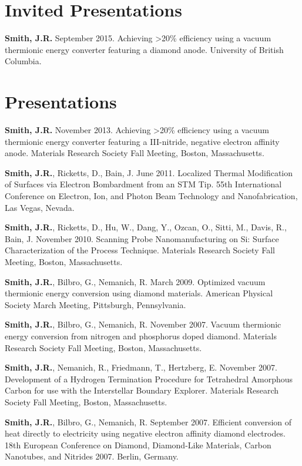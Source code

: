 \section{Invited Presentations}\label{invited-presentations}

\textbf{Smith, J.R.} September 2015. Achieving \textgreater{}20\%
efficiency using a vacuum thermionic energy converter featuring a
diamond anode. University of British Columbia.

\section{Presentations}\label{presentations}

\textbf{Smith, J.R.} November 2013. Achieving \textgreater{}20\%
efficiency using a vacuum thermionic energy converter featuring a
III-nitride, negative electron affinity anode. Materials Research
Society Fall Meeting, Boston, Massachusetts.

\textbf{Smith, J.R.}, Ricketts, D., Bain, J. June 2011. Localized
Thermal Modification of Surfaces via Electron Bombardment from an STM
Tip. 55th International Conference on Electron, Ion, and Photon Beam
Technology and Nanofabrication, Las Vegas, Nevada.

\textbf{Smith, J.R.}, Ricketts, D., Hu, W., Dang, Y., Ozcan, O., Sitti,
M., Davis, R., Bain, J. November 2010. Scanning Probe Nanomanufacturing
on Si: Surface Characterization of the Process Technique. Materials
Research Society Fall Meeting, Boston, Massachusetts.

\textbf{Smith, J.R.}, Bilbro, G., Nemanich, R. March 2009. Optimized
vacuum thermionic energy conversion using diamond materials. American
Physical Society March Meeting, Pittsburgh, Pennsylvania.

\textbf{Smith, J.R.}, Bilbro, G., Nemanich, R. November 2007. Vacuum
thermionic energy conversion from nitrogen and phosphorus doped diamond.
Materials Research Society Fall Meeting, Boston, Massachusetts.

\textbf{Smith, J.R.}, Nemanich, R., Friedmann, T., Hertzberg, E.
November 2007. Development of a Hydrogen Termination Procedure for
Tetrahedral Amorphous Carbon for use with the Interstellar Boundary
Explorer. Materials Research Society Fall Meeting, Boston,
Massachusetts.

\textbf{Smith, J.R.}, Bilbro, G., Nemanich, R. September 2007. Efficient
conversion of heat directly to electricity using negative electron
affinity diamond electrodes. 18th European Conference on Diamond,
Diamond-Like Materials, Carbon Nanotubes, and Nitrides 2007. Berlin,
Germany.

